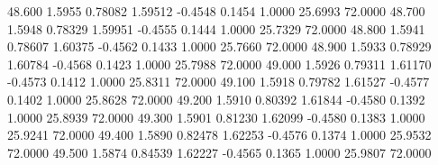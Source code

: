   48.600   1.5955   0.78082   1.59512  -0.4548   0.1454   1.0000  25.6993  72.0000
  48.700   1.5948   0.78329   1.59951  -0.4555   0.1444   1.0000  25.7329  72.0000
  48.800   1.5941   0.78607   1.60375  -0.4562   0.1433   1.0000  25.7660  72.0000
  48.900   1.5933   0.78929   1.60784  -0.4568   0.1423   1.0000  25.7988  72.0000
  49.000   1.5926   0.79311   1.61170  -0.4573   0.1412   1.0000  25.8311  72.0000
  49.100   1.5918   0.79782   1.61527  -0.4577   0.1402   1.0000  25.8628  72.0000
  49.200   1.5910   0.80392   1.61844  -0.4580   0.1392   1.0000  25.8939  72.0000
  49.300   1.5901   0.81230   1.62099  -0.4580   0.1383   1.0000  25.9241  72.0000
  49.400   1.5890   0.82478   1.62253  -0.4576   0.1374   1.0000  25.9532  72.0000
  49.500   1.5874   0.84539   1.62227  -0.4565   0.1365   1.0000  25.9807  72.0000
